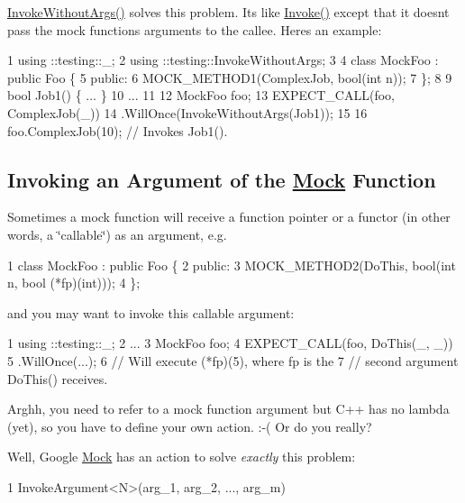 {\ttfamily \hyperlink{namespacetesting_a88cc1999296bc630f6a49cdf66bb21f9}{Invoke\+Without\+Args()}} solves this problem. It\textquotesingle{}s like {\ttfamily \hyperlink{namespacetesting_a12aebaf8363d49a383047529f798b694}{Invoke()}} except that it doesn\textquotesingle{}t pass the mock function\textquotesingle{}s arguments to the callee. Here\textquotesingle{}s an example\+:


\begin{DoxyCode}
1 using ::testing::\_;
2 using ::testing::InvokeWithoutArgs;
3 
4 class MockFoo : public Foo \{
5  public:
6   MOCK\_METHOD1(ComplexJob, bool(int n));
7 \};
8 
9 bool Job1() \{ ... \}
10 ...
11 
12   MockFoo foo;
13   EXPECT\_CALL(foo, ComplexJob(\_))
14       .WillOnce(InvokeWithoutArgs(Job1));
15 
16   foo.ComplexJob(10);  // Invokes Job1().
\end{DoxyCode}


\subsection*{Invoking an Argument of the \hyperlink{class_mock}{Mock} Function}

Sometimes a mock function will receive a function pointer or a functor (in other words, a \char`\"{}callable\char`\"{}) as an argument, e.\+g.


\begin{DoxyCode}
1 class MockFoo : public Foo \{
2  public:
3   MOCK\_METHOD2(DoThis, bool(int n, bool (*fp)(int)));
4 \};
\end{DoxyCode}


and you may want to invoke this callable argument\+:


\begin{DoxyCode}
1 using ::testing::\_;
2 ...
3   MockFoo foo;
4   EXPECT\_CALL(foo, DoThis(\_, \_))
5       .WillOnce(...);
6   // Will execute (*fp)(5), where fp is the
7   // second argument DoThis() receives.
\end{DoxyCode}


Arghh, you need to refer to a mock function argument but C++ has no lambda (yet), so you have to define your own action. \+:-\/( Or do you really?

Well, Google \hyperlink{class_mock}{Mock} has an action to solve {\itshape exactly} this problem\+:


\begin{DoxyCode}
1 InvokeArgument<N>(arg\_1, arg\_2, ..., arg\_m)
\end{DoxyCode}


